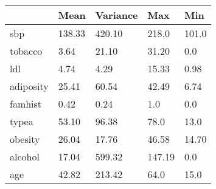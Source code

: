 
\begin{tabular}{| l | l | l | l | l |}
\hline
 & Mean & Variance & Max & Min \\ \hline
sbp	& 138.33 & 420.10 & 218.0 & 101.0 \\ \hline
tobacco	& 3.64 & 21.10 & 31.20 & 0.0 \\ \hline
ldl	&  4.74 & 4.29 & 15.33 & 0.98 \\ \hline
adiposity & 25.41 & 60.54 & 42.49 & 6.74 \\ \hline
famhist & 0.42 & 0.24 & 1.0 & 0.0 \\ \hline
typea	& 53.10 & 96.38 & 78.0 & 13.0 \\ \hline
obesity & 26.04 & 17.76 & 46.58 & 14.70 \\ \hline
alcohol	& 17.04 & 599.32 & 147.19 & 0.0 \\ \hline
age	& 42.82 & 213.42 & 64.0 & 15.0 \\ \hline
\end{tabular}
